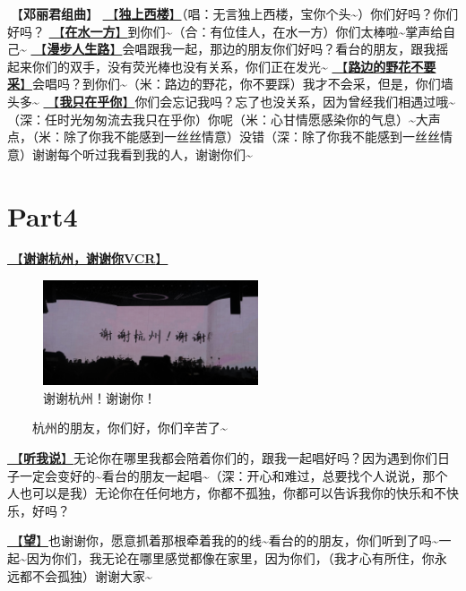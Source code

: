 \documentclass[]{ctexbook}
\begin{document}
🎵【\textbf{邓丽君组曲}】
\hyperref[one-in-the-building]{🎵【\textbf{独上西楼}】}（唱：无言独上西楼，宝你个头\textasciitilde）你们好吗？你们好吗？
\hyperref[on-the-water-side]{🎵【\textbf{在水一方}】}到你们\textasciitilde（合：有位佳人，在水一方）你们太棒啦\textasciitilde 掌声给自己\textasciitilde{}
\hyperref[walk-the-road-of-life]{🎵【\textbf{漫步人生路}】}会唱跟我一起，那边的朋友你们好吗？看台的朋友，跟我摇起来你们的双手，没有荧光棒也没有关系，你们正在发光\textasciitilde{}
\hyperref[only-with-me]{🎵【\textbf{路边的野花不要采}】}会唱吗？到你们\textasciitilde（米：路边的野花，你不要踩）我才不会采，但是，你们墙头多\textasciitilde{}
\hyperref[only-you]{🎵【\textbf{我只在乎你}】}你们会忘记我吗？忘了也没关系，因为曾经我们相遇过哦\textasciitilde（深：任时光匆匆流去我只在乎你）你呢（米：心甘情愿感染你的气息）\textasciitilde 大声点，（米：除了你我不能感到一丝丝情意）没错（深：除了你我不能感到一丝丝情意）谢谢每个听过我看到我的人，谢谢你们\textasciitilde{}

\section{Part4}\label{hangzhou-20240824-part4}

\hyperref[thank-you-vcr]{🎥【\textbf{谢谢杭州，谢谢你VCR}】}

\begin{figure}

{\centering \includegraphics[width=180pt]{img/hangzhou20240824/thank-hangzhou} 

}

\caption{谢谢杭州！谢谢你！}\label{fig:unnamed-chunk-72}
\end{figure}

  杭州的朋友，你们好，你们辛苦了\textasciitilde{}

\hyperref[listen-to-me]{🎵【\textbf{听我说}】}无论你在哪里我都会陪着你们的，跟我一起唱好吗？因为遇到你们日子一定会变好的\textasciitilde 看台的朋友一起唱\textasciitilde（深：开心和难过，总要找个人说说，那个人也可以是我）无论你在任何地方，你都不孤独，你都可以告诉我你的快乐和不快乐，好吗？

\hyperref[hope]{🎵【\textbf{望}】}也谢谢你，愿意抓着那根牵着我的的线\textasciitilde 看台的的朋友，你们听到了吗\textasciitilde 一起\textasciitilde 因为你们，我无论在哪里感觉都像在家里，因为你们，（我才心有所住，你永远都不会孤独）谢谢大家\textasciitilde{}
\end{document}
